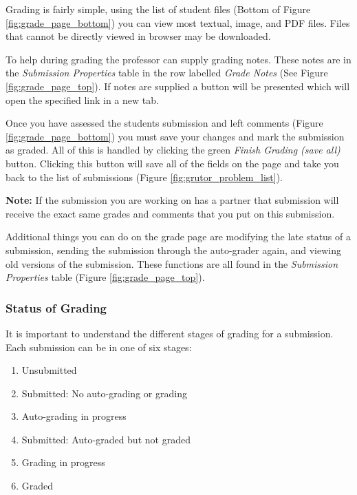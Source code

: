 \documentclass[11pt]{report}
\begin{document}
Grading is fairly simple, using the list of student files (Bottom of Figure \ref{fig:grade_page_bottom}) you
can view most textual, image, and PDF files. Files that cannot be directly viewed in browser may be
downloaded. 

To help during grading the professor can supply grading notes. These notes are in the \emph{Submission Properties}
table in the row labelled \emph{Grade Notes} (See Figure \ref{fig:grade_page_top}). If notes are supplied a button 
will be presented which will open the specified link in a new tab.

Once you have assessed the students submission and left comments (Figure \ref{fig:grade_page_bottom}) you must
save your changes and mark the submission as graded. All of this is handled by clicking the green
\emph{Finish Grading (save all)} button. Clicking this button will save all of the fields on the page and 
take you back to the list of submissions (Figure \ref{fig:grutor_problem_list}).

\noindent\textbf{Note:} If the submission you are working on has a partner that submission will receive the
exact same grades and comments that you put on this submission.

Additional things you can do on the grade page are modifying the late status of a submission, sending the
submission through the auto-grader again, and viewing old versions of the submission. These functions are 
all found in the \emph{Submission Properties} table (Figure \ref{fig:grade_page_top}).

\subsubsection{Status of Grading}

It is important to understand the different stages of grading for a submission. Each submission can be in
one of six stages:
\begin{enumerate}
\item Unsubmitted
\item Submitted: No auto-grading or grading
\item Auto-grading in progress
\item \label{item:autograded} Submitted: Auto-graded but not graded
\item \label{item:inprogress} Grading in progress
\item \label{item:graded} Graded
\end{enumerate}
\end{document}
